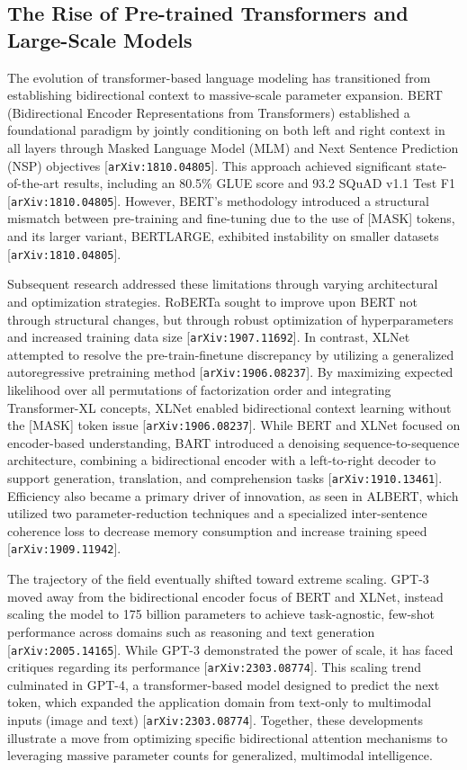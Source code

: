 \documentclass[11pt]{article}
\begin{document}
\subsection{The Rise of Pre-trained Transformers and Large-Scale Models}

The evolution of transformer-based language modeling has transitioned from establishing bidirectional context to massive-scale parameter expansion. BERT (Bidirectional Encoder Representations from Transformers) established a foundational paradigm by jointly conditioning on both left and right context in all layers through Masked Language Model (MLM) and Next Sentence Prediction (NSP) objectives [\texttt{arXiv:1810.04805}]. This approach achieved significant state-of-the-art results, including an 80.5\% GLUE score and 93.2 SQuAD v1.1 Test F1 [\texttt{arXiv:1810.04805}]. However, BERT's methodology introduced a structural mismatch between pre-training and fine-tuning due to the use of [MASK] tokens, and its larger variant, BERTLARGE, exhibited instability on smaller datasets [\texttt{arXiv:1810.04805}].

Subsequent research addressed these limitations through varying architectural and optimization strategies. RoBERTa sought to improve upon BERT not through structural changes, but through robust optimization of hyperparameters and increased training data size [\texttt{arXiv:1907.11692}]. In contrast, XLNet attempted to resolve the pre-train-finetune discrepancy by utilizing a generalized autoregressive pretraining method [\texttt{arXiv:1906.08237}]. By maximizing expected likelihood over all permutations of factorization order and integrating Transformer-XL concepts, XLNet enabled bidirectional context learning without the [MASK] token issue [\texttt{arXiv:1906.08237}]. While BERT and XLNet focused on encoder-based understanding, BART introduced a denoising sequence-to-sequence architecture, combining a bidirectional encoder with a left-to-right decoder to support generation, translation, and comprehension tasks [\texttt{arXiv:1910.13461}]. Efficiency also became a primary driver of innovation, as seen in ALBERT, which utilized two parameter-reduction techniques and a specialized inter-sentence coherence loss to decrease memory consumption and increase training speed [\texttt{arXiv:1909.11942}].

The trajectory of the field eventually shifted toward extreme scaling. GPT-3 moved away from the bidirectional encoder focus of BERT and XLNet, instead scaling the model to 175 billion parameters to achieve task-agnostic, few-shot performance across domains such as reasoning and text generation [\texttt{arXiv:2005.14165}]. While GPT-3 demonstrated the power of scale, it has faced critiques regarding its performance [\texttt{arXiv:2303.08774}]. This scaling trend culminated in GPT-4, a transformer-based model designed to predict the next token, which expanded the application domain from text-only to multimodal inputs (image and text) [\texttt{arXiv:2303.08774}]. Together, these developments illustrate a move from optimizing specific bidirectional attention mechanisms to leveraging massive parameter counts for generalized, multimodal intelligence.
\end{document}
